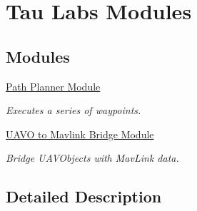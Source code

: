 \hypertarget{group___tau_labs_modules}{\section{Tau Labs Modules}
\label{group___tau_labs_modules}
}
\subsection*{Modules}
\begin{DoxyCompactItemize}
\item 
\hyperlink{group___path_planner}{Path Planner Module}
\begin{DoxyCompactList}\small\item\em Executes a series of waypoints. \end{DoxyCompactList}\item 
\hyperlink{group___u_a_v_o_mavlink_bridge}{U\-A\-V\-O to Mavlink Bridge Module}
\begin{DoxyCompactList}\small\item\em Bridge U\-A\-V\-Objects with Mav\-Link data. \end{DoxyCompactList}\end{DoxyCompactItemize}


\subsection{Detailed Description}
